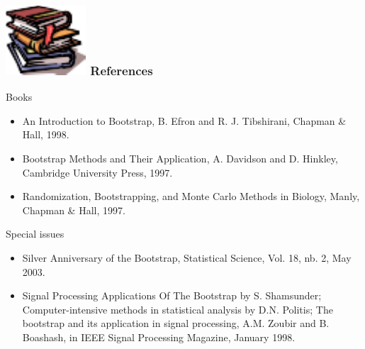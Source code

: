 

\frame
{
\frametitle{\includegraphics[width=.8cm]{images/books} References}

\begin{block}{Books}

\begin{itemize}
\item \alert{An Introduction to Bootstrap}, B. Efron and R. J. Tibshirani, Chapman \& Hall, 1998.
\item \alert{Bootstrap Methods and Their Application}, A. Davidson and D. Hinkley, Cambridge University Press, 1997.
\item \alert{Randomization, Bootstrapping, and Monte Carlo Methods in Biology}, Manly,   Chapman \& Hall, 1997.
\end{itemize}
\end{block}
\begin{block}{Special issues}
\begin{itemize}
\item \alert{Silver Anniversary of the Bootstrap}, Statistical Science, Vol. 18, nb. 2, May 2003.
\item \alert{Signal Processing Applications Of The Bootstrap} by S. Shamsunder; \alert {Computer-intensive methods in statistical analysis} by D.N. Politis;
\alert{The bootstrap and its application in signal processing}, A.M. Zoubir and B.  Boashash, in IEEE Signal Processing Magazine, January 1998.
\end{itemize}
\end{block}
}


